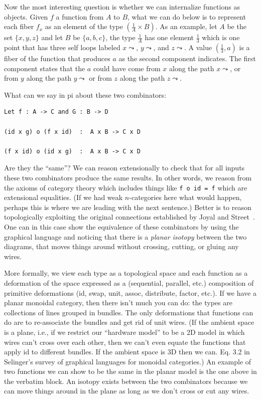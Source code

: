 \documentclass[11pt]{article}
\renewcommand{\path}{\leadsto}
\begin{document}
Now the most interesting question is whether we can internalize functions as
objects. Given $f$ a function from $A$ to $B$, what we can do below is to
represent each fiber $f_x$ as an element of the type $(\frac{1}{A} \times
B)$. As an example, let $A$ be the set $\{x,y,z\}$ and let $B$ be
$\{a,b,c\}$, the type $\frac{1}{A}$ has one element $\frac{1}{3}$ which is
one point that has three self loops labeled $x \path$, $y \path$, and $z
\path$. A value $(\frac{1}{3},a)$ is a fiber of the function that produces
$a$ as the second component indicates. The first component states that the
$a$ could have come from $x$ along the path $x \path$, or from $y$ along the
path $y \path$ or from $z$ along the path $z \path$.






\newpage

What can we say in pi about these two combinators:
\begin{verbatim}
Let f : A -> C and G : B -> D

(id x g) o (f x id)  :  A x B -> C x D

(f x id) o (id x g)  :  A x B -> C x D
\end{verbatim}
Are they the ``same''? We can reason extensionally to check that for all
inputs these two combinators produce the same results. In other words, we
reason from the axioms of category theory which includes things like
\verb|f o id = f| which are extensional equalities. (If we had weak
$n$-categories here what would happen, perhaps this is where we are leading
with the next sentence.) Better is to reason topologically exploiting the
original connections established by Joyal and
Street~\cite{planardiagrams,geometrytensor}. One can in this case show the
equivalence of these combinators by using the graphical language and noticing
that there is a \emph{planar isotopy} between the two diagrams, that moves
things around without crossing, cutting, or gluing any wires. 

More formally, we view each type as a topological space and each function as
a deformation of the space expressed as a (sequential, parallel, etc.)
composition of primitive deformations (id, swap, unit, assoc, distribute,
factor, etc.). If we have a planar monoidal category, then there isn't much
you can do: the types are collections of lines grouped in bundles. The only
deformations that functions can do are to re-associate the bundles and get
rid of unit wires. (If the ambient space is a plane, i.e., if we restrict our
``hardware model'' to be a 2D model in which wires can't cross over each
other, then we can't even equate the functions that apply id to different
bundles. If the ambient space is 3D then we can. Eq. 3.2 in Selinger's survey
of graphical languages for monoidal categories.) An example of two functions
we can show to be the same in the planar model is the one above in the
verbatim block. An isotopy exists between the two combinators because we can
move things around in the plane as long as we don't cross or cut any wires.
\end{document}
